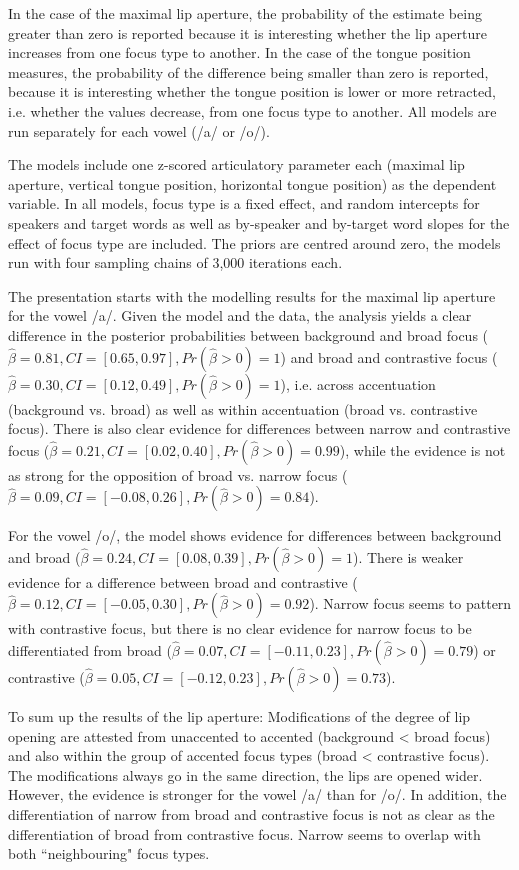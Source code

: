 In the case of the maximal lip aperture, the probability of the estimate being greater than zero is reported because it is interesting whether the lip aperture increases from one focus type to another. In the case of the tongue position measures, the probability of the difference being smaller than zero is reported, because it is interesting  whether the tongue position is lower or more retracted, i.e. whether the values decrease, from one focus type to another. All models are run separately for each vowel (/a/ or /o/).

The models include one z-scored articulatory parameter each (maximal lip aperture, vertical tongue position, horizontal tongue position) as the dependent variable. In all models, focus type is a fixed effect, and random intercepts for speakers and target words as well as by-speaker and by-target word slopes for the effect of focus type are included. The priors are centred around zero, the models run with four sampling chains of 3,000 iterations each.

The presentation starts with the modelling results for the maximal lip aperture for the vowel /a/. Given the model and the data, the analysis yields a clear difference in the posterior probabilities between background and broad focus ($\hat\beta=0.81 , CI=[0.65, 0.97], \allowbreak Pr(\hat\beta>0)=1$) and broad and contrastive focus ($\hat\beta=0.30 , CI=[0.12, 0.49], \allowbreak Pr(\hat\beta>0)=1$), i.e. across accentuation (background vs. broad) as well as within accentuation (broad vs. contrastive focus). There is also clear evidence for differences between narrow and contrastive focus ($\hat\beta=0.21 , CI=[0.02, 0.40], \allowbreak Pr(\hat\beta>0)=0.99$), while the evidence is not as strong for the opposition of broad vs. narrow focus ($\hat\beta=0.09 , CI=\allowbreak[-0.08, 0.26], \allowbreak Pr(\hat\beta>0)=0.84$).

For the vowel /o/, the model shows evidence for differences between background and broad ($\hat\beta=0.24 , CI=[0.08, 0.39], \allowbreak Pr(\hat\beta>0)=1$). There is weaker evidence for a difference between broad and contrastive ($\hat\beta=0.12, CI=[-0.05, 0.30], \allowbreak Pr(\hat\beta>0)=0.92$). Narrow focus seems to pattern with contrastive focus, but there is no clear evidence for narrow focus to be differentiated from broad ($\hat\beta=0.07 , CI=[-0.11, 0.23], \allowbreak Pr(\hat\beta>0)=0.79$) or contrastive ($\hat\beta=0.05, CI=[-0.12, \allowbreak 0.23], \allowbreak Pr(\hat\beta>0)=0.73$). 

To sum up the results of the lip aperture: Modifications of the degree of lip opening are attested from unaccented to accented (background < broad focus) and also within the group of accented focus types (broad < contrastive focus). The modifications always go in the same direction, the lips are opened wider. However, the evidence is stronger for the vowel /a/ than for /o/. In addition, the differentiation of narrow from broad and contrastive focus is not as clear as the differentiation of broad from contrastive focus. Narrow seems to overlap with both ``neighbouring" focus types.

